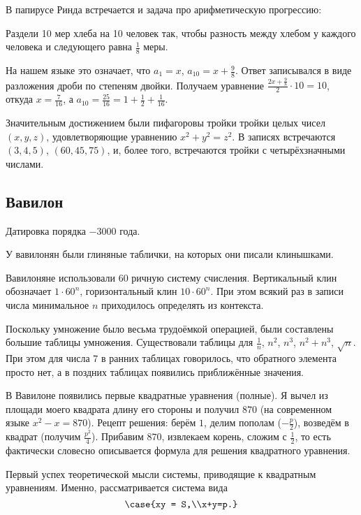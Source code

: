 \documentclass[a4paper,oneside,fleqn,10pt]{article}
\begin{document}
В папирусе Ринда  встречается и задача про арифметическую прогрессию:
\begin{problem}
Раздели 10 мер хлеба на 10 человек так, чтобы разность между хлебом
у каждого человека и следующего равна $\frac18$ меры.
\end{problem}

На нашем языке это означает, что $a_1 = x$, $a_{10} = x+\frac98$.
Ответ записывался в виде разложения дроби по степеням двойки.
Получаем уравнение $\frac{2x + \frac98}{2}\cdot 10 = 10$,
откуда $x = \frac{7}{16}$, а $a_{10} = \frac{25}{16} = 1 + \frac12 + \frac1{16}$.

Значительным достижением были пифагоровы тройки тройки целых чисел $(x,y,z)$, удовлетворяющие
уравнению $x^2 + y^2 = z^2$. В записях встречаются $(3,4,5)$, $(60,45,75)$,
и, более того, встречаются тройки с четырёхзначными числами.

\subsection{Вавилон}

Датировка порядка $-3000$ года.

У вавилонян были глиняные таблички, на которых они писали клинышками.

Вавилоняне использовали 60 ричную систему счисления. Вертикальный клин
обозначает $1\cdot 60^n$, горизонтальный клин $10\cdot 60^n$.
При этом всякий раз в записи числа минимальное $n$ приходилось определять
из контекста.

Поскольку умножение было весьма трудоёмкой операцией, были составлены
большие таблицы умножения. Существовали таблицы для
$\frac1n$, $n^2$, $n^3$, $n^2+ n^3$, $\sqrt n$.  При этом для числа $7$
в ранних таблицах говорилось, что обратного элемента просто нет,
а в поздних таблицах появились приближённые значения.

В Вавилоне появились первые квадратные уравнения (полные).
Я вычел из площади моего квадрата длину его стороны и получил $870$
(на современном языке $x^2-x=870$). Рецепт решения: берём $1$, делим пополам ($-\frac{p}{2}$),
возведём в квадрат (получим $\frac{p^2}{4}$). Прибавим $870$, извлекаем корень, сложим с $\frac{1}{2}$,
то есть фактически словесно описывается формула для решения квадратного уравнения.

Первый успех теоретической мысли системы, приводящие к квадратным уравнениям.
Именно, рассматривается система вида
$$\case{xy = S,\\x+y=p.}$$
\end{document}
